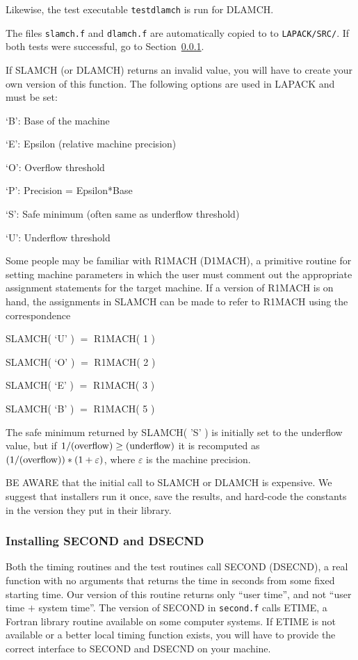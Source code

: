 Likewise, the test executable {\tt testdlamch} is run for DLAMCH.

The files {\tt slamch.f} and {\tt dlamch.f} are automatically copied to
to {\tt LAPACK/SRC/}.
If both tests were successful, go to Section~\ref{second}.

If SLAMCH (or DLAMCH) returns an invalid value, you will have to create
your own version of this function.  The following options are used in
LAPACK and must be set:

\begin{list}{}{}
\item {`B': }  Base of the machine
\item {`E': }  Epsilon (relative machine precision)
\item {`O': }  Overflow threshold
\item {`P': }  Precision = Epsilon*Base
\item {`S': }  Safe minimum (often same as underflow threshold)
\item {`U': }  Underflow threshold
\end{list}

Some people may be familiar with R1MACH (D1MACH), a primitive
routine for setting machine parameters in which the user must
comment out the appropriate assignment statements for the target
machine.  If a version of R1MACH is on hand, the assignments in
SLAMCH can be made to refer to R1MACH using the correspondence

\begin{list}{}{}
\item {SLAMCH( `U' )}  $=$ R1MACH( 1 )
\item {SLAMCH( `O' )}  $=$ R1MACH( 2 )
\item {SLAMCH( `E' )}  $=$ R1MACH( 3 )
\item {SLAMCH( `B' )}  $=$ R1MACH( 5 )
\end{list}

\noindent
The safe minimum returned by SLAMCH( 'S' ) is initially set to the
underflow value, but if $1/({\rm overflow}) \geq ({\rm underflow})$
it is recomputed as $(1/({\rm overflow})) * ( 1 + \varepsilon )$,
where $\varepsilon$ is the machine precision.

BE AWARE that the initial call to SLAMCH or DLAMCH is expensive.  
We suggest that installers run it once, save the results, and hard-code
the constants in the version they put in their library.

\subsubsection{Installing SECOND and DSECND}\label{second}
\dent
Both the timing routines and the test routines call SECOND
(DSECND), a real function with no arguments that returns the time
in seconds from some fixed starting time.
Our version of this routine returns only ``user time'', and
not ``user time $+$ system time''. 
The version of SECOND in {\tt second.f} calls ETIME, a Fortran library
routine available on some computer systems.
If ETIME is not available or a better local timing function exists,
you will have to provide the correct interface to SECOND and DSECND
on your machine.

